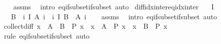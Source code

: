 \begin{isabellebody}
%
\isadelimproof
\ \ %
\endisadelimproof
%
\isatagproof
{}\isamarkupfalse%
\ assms\ \isamarkupfalse%
\ {\isacharparenleft}{\kern0pt}intro\ eq{\isacharunderscore}{\kern0pt}if{\isacharunderscore}{\kern0pt}subset{\isacharunderscore}{\kern0pt}if{\isacharunderscore}{\kern0pt}subset{\isacharparenright}{\kern0pt}\ auto%
\endisatagproof
{\isafoldproof}%
%
\isadelimproof
\isanewline
%
\endisadelimproof
\isanewline
{}\isamarkupfalse%
\ diff{\isacharunderscore}{\kern0pt}idx{\isacharunderscore}{\kern0pt}inter{\isacharunderscore}{\kern0pt}eq{\isacharunderscore}{\kern0pt}idx{\isacharunderscore}{\kern0pt}inter{\isacharcolon}{\kern0pt}\isanewline
\ \ \ {\isachardoublequoteopen}I\ {\isasymnoteq}\ {\isacharbraceleft}{\kern0pt}{\isacharbraceright}{\kern0pt}{\isachardoublequoteclose}\isanewline
\ \ \ {\isachardoublequoteopen}B\ {\isasymsetminus}\ {\isacharparenleft}{\kern0pt}{\isasymInter}i{\isasymin}\ I{\isachardot}{\kern0pt}\ A\ i{\isacharparenright}{\kern0pt}\ {\isacharequal}{\kern0pt}\ {\isacharparenleft}{\kern0pt}{\isasymUnion}i{\isasymin}\ I{\isachardot}{\kern0pt}\ B\ {\isasymsetminus}\ A\ i{\isacharparenright}{\kern0pt}{\isachardoublequoteclose}\isanewline
%
\isadelimproof
\ \ %
\endisadelimproof
%
\isatagproof
{}\isamarkupfalse%
\ assms\ \isamarkupfalse%
\ {\isacharparenleft}{\kern0pt}intro\ eq{\isacharunderscore}{\kern0pt}if{\isacharunderscore}{\kern0pt}subset{\isacharunderscore}{\kern0pt}if{\isacharunderscore}{\kern0pt}subset{\isacharparenright}{\kern0pt}\ auto%
\endisatagproof
{\isafoldproof}%
%
\isadelimproof
\isanewline
%
\endisadelimproof
\isanewline
{}\isamarkupfalse%
\ collect{\isacharunderscore}{\kern0pt}diff{\isacharcolon}{\kern0pt}\ {\isachardoublequoteopen}{\isacharbraceleft}{\kern0pt}x\ {\isasymin}\ {\isacharparenleft}{\kern0pt}A\ {\isasymsetminus}\ B{\isacharparenright}{\kern0pt}\ {\isacharbar}{\kern0pt}\ P\ x{\isacharbraceright}{\kern0pt}\ {\isacharequal}{\kern0pt}\ {\isacharbraceleft}{\kern0pt}x\ {\isasymin}\ A\ {\isacharbar}{\kern0pt}\ P\ x{\isacharbraceright}{\kern0pt}\ {\isasymsetminus}\ {\isacharbraceleft}{\kern0pt}x\ {\isasymin}\ B\ {\isacharbar}{\kern0pt}\ P\ x{\isacharbraceright}{\kern0pt}{\isachardoublequoteclose}\isanewline
%
\isadelimproof
\ \ %
\endisadelimproof
%
\isatagproof
{}\isamarkupfalse%
\ {\isacharparenleft}{\kern0pt}rule\ eq{\isacharunderscore}{\kern0pt}if{\isacharunderscore}{\kern0pt}subset{\isacharunderscore}{\kern0pt}if{\isacharunderscore}{\kern0pt}subset{\isacharparenright}{\kern0pt}\ auto%

\end{isabellebody}
